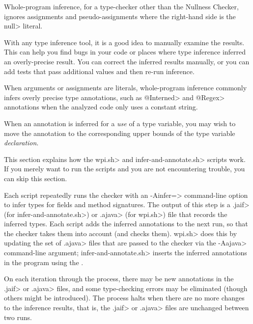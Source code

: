Whole-program inference, for a type-checker other than the Nullness Checker,
ignores assignments and pseudo-assignments where the right-hand side is the \<null> literal.



With any type inference tool, it is a good idea to manually examine the
results.  This can help you find bugs in your code or places where type
inference inferred an overly-precise result.
You can correct the inferred results manually, or you can
add tests that pass additional values and then re-run inference.

When arguments or assignments are literals, whole-program inference
commonly infers overly precise type annotations, such as \<@Interned> and
\<@Regex> annotations when the analyzed code only uses a constant string.

When an annotation is inferred for a \emph{use} of a type variable,
you may wish to move the annotation
to the corresponding upper bounds of the type variable \emph{declaration}.



This section explains how the \<wpi.sh> and \<infer-and-annotate.sh> scripts work.  If you
merely want to run the scripts and you are not encountering trouble, you can
skip this section.

Each script repeatedly runs the checker with an \<-Ainfer=> command-line option to infer
types for fields and method signatures.  The output of this step
is a \<.jaif> (for \<infer-and-annotate.sh>) or \<.ajava> (for \<wpi.sh>) file that records the inferred types.
Each script adds the inferred annotations to the next run, so that the checker takes them into
account (and checks them). \<wpi.sh> does this by updating the set of \<.ajava> files that are passed
to the checker via the \<-Aajava> command-line argument;
\<infer-and-annotate.sh> inserts the inferred annotations in the program using the
.

On each
iteration through the process, there may be new annotations in the \<.jaif> or \<.ajava>
files, and some type-checking errors may be eliminated (though others might
be introduced).
The process halts when there are no more changes to the inference results,
that is, the \<.jaif> or \<.ajava> files are unchanged between two runs.

